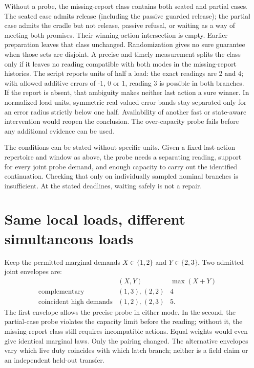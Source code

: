 \documentclass[11pt]{article}
\begin{document}
Without a probe, the missing-report class contains both seated and partial cases. The seated case admits release (including the passive guarded release); the partial case admits the cradle but not release, passive refusal, or waiting as a way of meeting both promises. Their winning-action intersection is empty. Earlier preparation leaves that class unchanged. Randomization gives no sure guarantee when those sets are disjoint. A precise and timely measurement splits the class only if it leaves no reading compatible with both modes in the missing-report histories. The script reports units of half a load: the exact readings are 2 and 4; with allowed additive errors of -1, 0 or 1, reading 3 is possible in both branches. If the report is absent, that ambiguity makes neither last action a sure winner. In normalized load units, symmetric real-valued error bands stay separated only for an error radius strictly below one half. Availability of another fast or state-aware intervention would reopen the conclusion. The over-capacity probe fails before any additional evidence can be used.

The conditions can be stated without specific units. Given a fixed last-action repertoire and window as above, the probe needs a separating reading, support for every joint probe demand, and enough capacity to carry out the identified continuation. Checking that only on individually sampled nominal branches is insufficient. At the stated deadlines, waiting safely is not a repair.

\section{Same local loads, different simultaneous loads}
Keep the permitted marginal demands \(X\in\{1,2\}\) and \(Y\in\{2,3\}\). Two admitted joint envelopes are:
\[
\begin{array}{c|c|c}
 & (X,Y) & \max(X+Y)\\\hline
 \text{complementary} & (1,3),(2,2)&4\\
 \text{coincident high demands} & (1,2),(2,3)&5 .
\end{array}
\]
The first envelope allows the precise probe in either mode. In the second, the partial-case probe violates the capacity limit before the reading; without it, the missing-report class still requires incompatible actions. Equal weights would even give identical marginal laws. Only the pairing changed. The alternative envelopes vary which live duty coincides with which latch branch; neither is a field claim or an independent held-out transfer.
\end{document}
